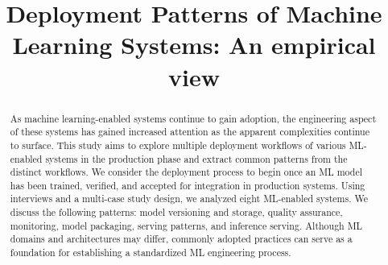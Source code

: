 \documentclass[conference]{IEEEtran}
\begin{document}
\graphicspath{ {./images/} }


\title{Deployment Patterns of Machine Learning Systems: An empirical view} %

\author{
\and
\and
{}
}

\maketitle

\begin{abstract}
As machine learning-enabled systems continue to gain adoption, the engineering aspect of these systems has gained increased attention as the apparent complexities continue to surface.
This study aims to explore multiple deployment workflows of various ML-enabled systems in the production phase and extract common patterns from the distinct workflows. We consider the deployment process to begin once an ML model has been trained, verified, and accepted for integration in production systems.
Using interviews and a multi-case study design, we analyzed eight ML-enabled systems.
We discuss the following patterns: model versioning and storage, quality assurance, monitoring, model packaging, serving patterns, and inference serving.
Although ML domains and architectures may differ, commonly adopted practices can serve as a foundation for establishing a standardized ML engineering process.

\end{abstract}
\end{document}
